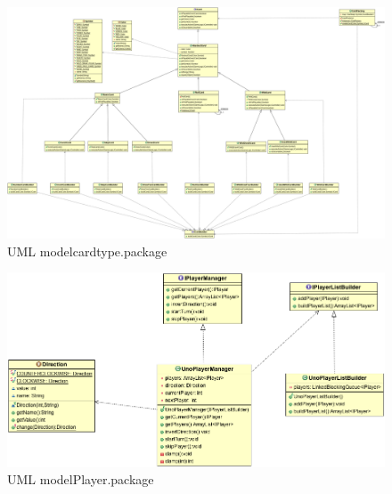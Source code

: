 \documentclass[letterpaper,11pt]{article}
\begin{document}
\begin{figure}[H]
\center
\includegraphics[scale=0.17]{modelcardtype.png}
\caption{UML modelcardtype.package}
\end{figure}
\begin{figure}[H]
\center
\includegraphics[scale=0.3]{modelPlayer.png}
\caption{UML modelPlayer.package}
\end{figure}
\end{document}
